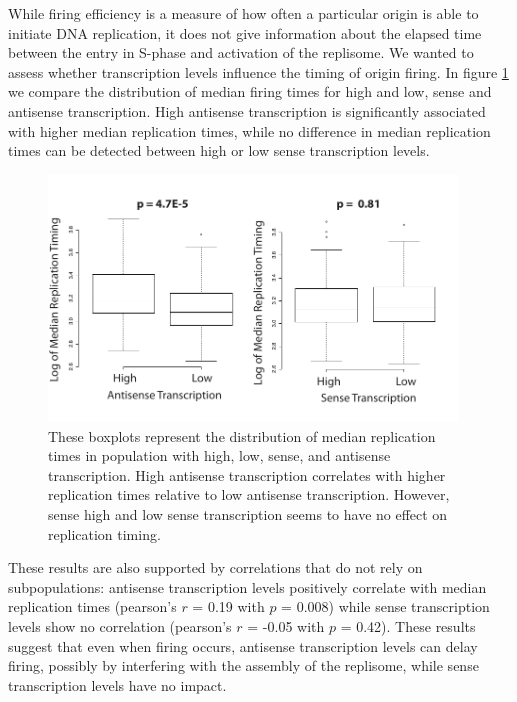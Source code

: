 While firing efficiency is a measure of how often a particular origin is able to initiate DNA replication, it does not give information about the elapsed time between the entry in S-phase and activation of the replisome. 
We wanted to assess whether transcription levels influence the timing of origin firing. 
In figure \ref{fig:timing} we compare the distribution of median firing times for high and low, sense and antisense transcription. 
High antisense transcription is significantly associated with higher median replication times, while no difference in median replication times can be detected between high or low sense transcription levels. 
\begin{figure}[h!]

\centering
\includegraphics[width=0.97\textwidth]{figures/results/timing}
\caption[Boxplots comparing median replication times in high- and low-transcription populations]{These boxplots represent the distribution of median replication times in population with high, low, sense, and antisense transcription. High antisense transcription correlates with higher replication times relative to low antisense transcription. However, sense high and low sense transcription seems to have no effect on replication timing.}
\label{fig:timing}

\end{figure} 
These results are also supported by correlations that do not rely on subpopulations: antisense transcription levels positively correlate with median replication times (pearson’s $r$ = 0.19 with $p$ = 0.008) while sense transcription levels show no correlation (pearson’s $r$ = -0.05 with $p$ = 0.42). These results suggest that even when firing occurs, antisense transcription levels can delay firing, possibly by interfering with the assembly of the replisome, while sense transcription levels have no impact.

